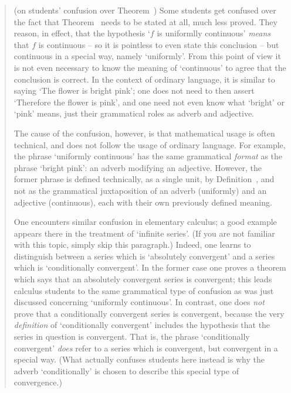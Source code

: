 \begin{quotation}
{\footnotesize \underline{\Note} (on students' confusion over Theorem~)
        Some students get confused over the fact that Theorem~ needs to be stated at all, much less proved.
    They reason, in effect, that the hypothesis `$f$ is uniformlly continuous' {\em means} that $f$ is continuous
    -- so it is pointless to even state this conclusion -- but continuous in a special way, namely `uniformly'.
    From this point of view it is not even necessary to know the meaning of `continuous' to agree that the conclusion is correct.
    In the context of ordinary language, it is similar to saying `The flower is bright pink';
    one does not need to then assert `Therefore the flower is pink', and one need not even know what `bright' or `pink' means,
    just their grammatical roles as adverb and adjective.

    The cause of the confusion, however, is that mathematical usage is often technical, and does not follow the usage of ordinary language.
    For example, the phrase `uniformly continuous' has the same grammatical  {\em format} as the phrase `bright pink': an adverb modifying an adjective.
    However, the former phrase is defined technically, as a single unit, by Definition~,
    and not as the grammatical juxtaposition of an adverb (uniformly) and an adjective (continuous), each with their own previously defined meaning.

        One encounters similar confusion in elementary calculus; a good example appears there in the treatment of `infinite series'.
    (If you are not familiar with this topic, simply skip this paragraph.)
    Indeed, one learns to distinguish between a series which is `absolutely convergent' and a series which is `conditionally convergent'.
    In the former case one proves a theorem which says that an absolutely convergent series is convergent;
    this leads calculus students to the same grammatical type of confusion as was just discussed concerning `uniformly continuous'.
    In contrast, one does {\em not} prove that a conditionally convergent series is convergent,
    because the very {\em definition} of `conditionally convergent' includes the hypothesis that the series in question is convergent.
    That is, the phrase `conditionally convergent' {\em does} refer to a series which is convergent, but convergent in a special way.
    (What actually confuses students here instead is why the adverb `conditionally' is chosen to describe this special type of convergence.)
}%
\end{quotation}

